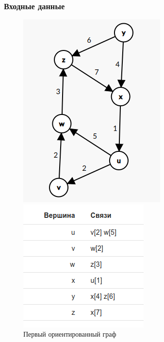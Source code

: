 \subsubsection{Входные данные}
\begin{figure}[H]
  \begin{minipage}{0.5\textwidth}
    \centering\includegraphics[width=0.6\linewidth]{figs/task-4/graph-3.png}
  \end{minipage}
  \begin{minipage}{0.5\textwidth}
    \centering\includegraphics[width=0.6\linewidth]{figs/task-4/adj-3.png}
  \end{minipage}
  \caption{Первый ориентированный граф}
\end{figure}

